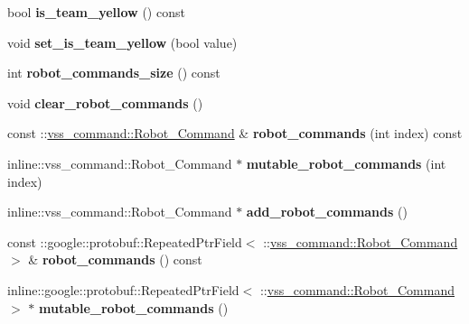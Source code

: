 \begin{DoxyCompactItemize}
\item 
bool {\bfseries is\+\_\+team\+\_\+yellow} () const \hypertarget{classvss__command_1_1Global__Commands_a82e8f2fd24d0bcbf30e924d18dd8bba8}{}\label{classvss__command_1_1Global__Commands_a82e8f2fd24d0bcbf30e924d18dd8bba8}

\item 
void {\bfseries set\+\_\+is\+\_\+team\+\_\+yellow} (bool value)\hypertarget{classvss__command_1_1Global__Commands_ac7855fe013be0c1be3f573a1b6eb47dc}{}\label{classvss__command_1_1Global__Commands_ac7855fe013be0c1be3f573a1b6eb47dc}

\item 
int {\bfseries robot\+\_\+commands\+\_\+size} () const \hypertarget{classvss__command_1_1Global__Commands_a09f12589e89e8d27a0e0d6fb7ecbcee3}{}\label{classvss__command_1_1Global__Commands_a09f12589e89e8d27a0e0d6fb7ecbcee3}

\item 
void {\bfseries clear\+\_\+robot\+\_\+commands} ()\hypertarget{classvss__command_1_1Global__Commands_a2624ae56ed92fe0cf6617f8c740ad2d2}{}\label{classvss__command_1_1Global__Commands_a2624ae56ed92fe0cf6617f8c740ad2d2}

\item 
const \+::\hyperlink{classvss__command_1_1Robot__Command}{vss\+\_\+command\+::\+Robot\+\_\+\+Command} \& {\bfseries robot\+\_\+commands} (int index) const \hypertarget{classvss__command_1_1Global__Commands_aa6bd99500ef874f4a68cbf1adecf0fd1}{}\label{classvss__command_1_1Global__Commands_aa6bd99500ef874f4a68cbf1adecf0fd1}

\item 
inline\+::vss\+\_\+command\+::\+Robot\+\_\+\+Command $\ast$ {\bfseries mutable\+\_\+robot\+\_\+commands} (int index)\hypertarget{classvss__command_1_1Global__Commands_a08dc88b20105318b2cc8bbbbf2300581}{}\label{classvss__command_1_1Global__Commands_a08dc88b20105318b2cc8bbbbf2300581}

\item 
inline\+::vss\+\_\+command\+::\+Robot\+\_\+\+Command $\ast$ {\bfseries add\+\_\+robot\+\_\+commands} ()\hypertarget{classvss__command_1_1Global__Commands_add6abc22ca67ffa146cfba3e0b17ad2b}{}\label{classvss__command_1_1Global__Commands_add6abc22ca67ffa146cfba3e0b17ad2b}

\item 
const \+::google\+::protobuf\+::\+Repeated\+Ptr\+Field$<$ \+::\hyperlink{classvss__command_1_1Robot__Command}{vss\+\_\+command\+::\+Robot\+\_\+\+Command} $>$ \& {\bfseries robot\+\_\+commands} () const \hypertarget{classvss__command_1_1Global__Commands_acb14464615fbad56ce9a1da3ce46373a}{}\label{classvss__command_1_1Global__Commands_acb14464615fbad56ce9a1da3ce46373a}

\item 
inline\+::google\+::protobuf\+::\+Repeated\+Ptr\+Field$<$ \+::\hyperlink{classvss__command_1_1Robot__Command}{vss\+\_\+command\+::\+Robot\+\_\+\+Command} $>$ $\ast$ {\bfseries mutable\+\_\+robot\+\_\+commands} ()\hypertarget{classvss__command_1_1Global__Commands_a3de88f16ed28f63fed38eff2ef169df4}{}\label{classvss__command_1_1Global__Commands_a3de88f16ed28f63fed38eff2ef169df4}

\end{DoxyCompactItemize}
